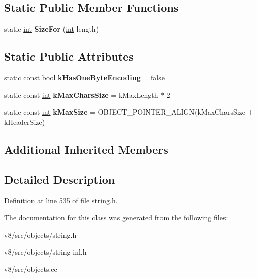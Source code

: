 \subsection*{Static Public Member Functions}
\begin{DoxyCompactItemize}
\item 
\mbox{\label{classv8_1_1internal_1_1SeqTwoByteString_a310700be9011633ec0da472bb31c16a9}} 
static \mbox{\hyperlink{classint}{int}} {\bfseries Size\+For} (\mbox{\hyperlink{classint}{int}} length)
\end{DoxyCompactItemize}
\subsection*{Static Public Attributes}
\begin{DoxyCompactItemize}
\item 
\mbox{\label{classv8_1_1internal_1_1SeqTwoByteString_ad26ef1753e8b390ca91d9d4d7627b01a}} 
static const \mbox{\hyperlink{classbool}{bool}} {\bfseries k\+Has\+One\+Byte\+Encoding} = false
\item 
\mbox{\label{classv8_1_1internal_1_1SeqTwoByteString_a62216c56b5614fcf54e5403586581ae7}} 
static const \mbox{\hyperlink{classint}{int}} {\bfseries k\+Max\+Chars\+Size} = k\+Max\+Length $\ast$ 2
\item 
\mbox{\label{classv8_1_1internal_1_1SeqTwoByteString_aea5b549a060721065740b5c3585a4cac}} 
static const \mbox{\hyperlink{classint}{int}} {\bfseries k\+Max\+Size} = O\+B\+J\+E\+C\+T\+\_\+\+P\+O\+I\+N\+T\+E\+R\+\_\+\+A\+L\+I\+GN(k\+Max\+Chars\+Size + k\+Header\+Size)
\end{DoxyCompactItemize}
\subsection*{Additional Inherited Members}


\subsection{Detailed Description}


Definition at line 535 of file string.\+h.



The documentation for this class was generated from the following files\+:\begin{DoxyCompactItemize}
\item 
v8/src/objects/string.\+h\item 
v8/src/objects/string-\/inl.\+h\item 
v8/src/objects.\+cc\end{DoxyCompactItemize}
